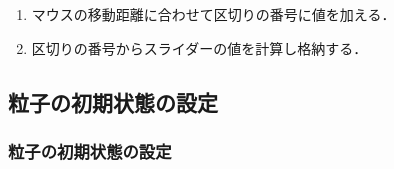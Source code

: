 \begin{enumerate}
   \setlength{\leftskip}{1.0cm}
  \item マウスの移動距離に合わせて区切りの番号に値を加える．
  \item 区切りの番号からスライダーの値を計算し格納する．
\end{enumerate}



\subsection{粒子の初期状態の設定}
\subsubsection{粒子の初期状態の設定}
\begin{screen}
{\small
\begin{verbatim}

\end{verbatim}}
\end{screen}
\fi

%

